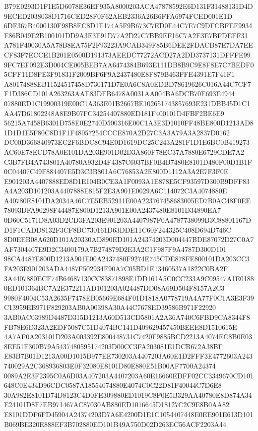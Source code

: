 \documentclass[UTF8,fontset=fandol,zihao=-4,a4paper]{ctexart}
\begin{document}
{{B79E0293D1F1E5D6078E36EF935A8000203ACA47878592E6D131F31488131D4D9ECED2038038D1716CED28F0F62AEB2336A26B6FFA6974FCED001E1D
6DF367B4000130F98B8EC8D1E174A5F9B673C7ED0E44C7E7C9DFCBFEF9934E86B049E2B100101DD9A3E3E91D77A2D27C7BB9EF16C7A2E3E7BFDEFF31
A781F40030A5A78B8EA75F2F93223A9CAB349F85B6DEE2FDACB87E7DA7EECF83F7ECCE1B201E0500D191373AEEDC77272ACD27A2DD3737131DFFFE99
9FC7EF092E3D004CE005BEB7AA6474384B693E111DB8B9C9E8F8E7C7BEDF05CFF11D8FE3F91831F2009BF6F9A2437480E8F879B463FFE4391E7F41F1
A80174888EB11524517458D730171D7E0A6C8A0EDBD78619626C016A44C7CF7F1D386CD101A263263AAE83DFB6478A0031AA004BA6DCB70E693E4944
07880ED1C19900319E00C1A363E01B2667BE102651743857693E231DBB45D1C1AA47D61802248A8E9B07FC34254407880ED181F400101D4FBF2BE6E9
56215A7458B6301D758E0E2740D500316E00C1A3E3D1010FF48BE800D1213AD81D1D1E5F80C8D1F1F48057254CCCE870A2D27C3A3A79A3A2837D0162
DC00D366840973EC2F6BDC8C94E0D1619DC25C243A281F1D1E6BC0B419273AC60E78ECD78A0E101DA203E901D02D3A860F78EC37A7880E6729CDE7A2
C3B7FB4A743801A40780A932D4F4387C6037BF0B4B7480E8101D480F00D1B1F0C04407C49F884407E5D3C3B801A6C76853A2E800D1112A3A2E7F3F0E
E901203A4407888ED8D1E104B0CE3A1F0093A1E878E5CF93597D300B9DFF83A4A203D101203A4407888E815F2E3A901E0029A6C114072C3A4074880E
A40780E8101DA2034A46C7E5EB52911E00A223767458683005ED7B0AC48F0EE78093DFA90298F44487E800D1213A901E00A2437480E8101D34890EA7
0D60C5171D8A03D2CD3FA203E901203A4407987F0A4787738099B3C88801167DD1F1CADD8132F3CF8BC730161D63DDE11C60F244325C408D694D746C
8D0EEB08A620D101A20330AD890ED101A24374203D004447BDE87072D27C0A7AF7304407E9D2C3400179A7B274879D2E3A2C1F987F9A4787D300D101
98CA4487E800D1213A901E00A2437480F9274E745CDE878FE800101DA203CC3FA203E901203ADA4487F502934F90A7C05BD1E13460537A1822C0BA2F
3A4407880ECF74B64687130CC83871898E1DD161A5C0CC233A9C09547A1E01880ED101364BC7A2E372211AD101203A024487DD08A69D504F8157A2C3
9980F4004C53A2635F7478EB05669E684F01D1818A0778719A4A77F0C1A3E3F39C13959EB971F829203AB0A00398A30A44C7678ED39586B971F22920
3AB0AC03989D4487D315D1213A60D513CD5801A2A36A740C6FBD9CA8344F8FB78E6D323A2EDF5087C51D4074BC141D409629457450BEEE8D1510615E
4A7AF0A203101D203A003392E800448731C7420F9885BCD2213A4074EC8B0E038EE51E300B79A5437480595174203D00CC3FA203081E1DCB672A38BF
E83B7B01D1213A00D1015B977EE730203A4407203A60E1D2FFF3E4772603A243740029A2C368936803E0F32080E8101D80E880E51B00AF7700A24374
0089A2E3F2395C0A6D03A407203A4407203A60E16660EDFF02CC3349670CD101648C0E434D96CDC0587A18554074880E4074C0C22D81F40044C7D6E8
30A982E8101D74D8123C4D0FE309880ED1019C8F0E5B329AA40780E8D874A34E24101D8F7EB971467AC87030AB880ED1016645D18127C2C9E8B0AA82
E8101DDF6FD45904A24374203D7A6E4200D1E1C1054407448E0EE901E613D101B069BE320E888EF3B702880ED101B49A750D02D263EC56ACF2203A44
}}
\end{document}
